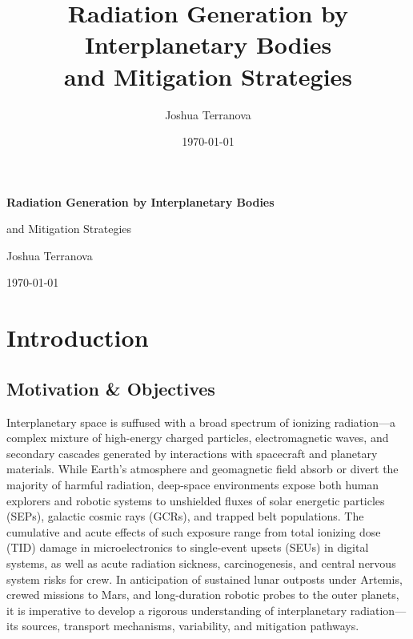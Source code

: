 \documentclass[12pt]{report}
\title{Radiation Generation by Interplanetary Bodies\\
       and Mitigation Strategies}
\author{Joshua Terranova}
\date{\today}
\begin{document}
\begin{titlepage}
  \centering
  {\LARGE\bfseries Radiation Generation by Interplanetary Bodies\\[1ex]}
  {\Large and Mitigation Strategies\par}
  \vspace{2cm}
  {\large Joshua Terranova\par}
  
  \vfill
  {\large \today\par}
\end{titlepage}

\setcounter{page}{1}

\tableofcontents
\newpage

\setcounter{page}{1}

\chapter{Introduction}

\section{Motivation \& Objectives}

Interplanetary space is suffused with a broad spectrum of ionizing radiation—a complex mixture of high-energy charged particles, electromagnetic waves, and secondary cascades generated by interactions with spacecraft and planetary materials.  While Earth’s atmosphere and geomagnetic field absorb or divert the majority of harmful radiation, deep-space environments expose both human explorers and robotic systems to unshielded fluxes of solar energetic particles (SEPs), galactic cosmic rays (GCRs), and trapped belt populations.  The cumulative and acute effects of such exposure range from total ionizing dose (TID) damage in microelectronics to single-event upsets (SEUs) in digital systems, as well as acute radiation sickness, carcinogenesis, and central nervous system risks for crew.  In anticipation of sustained lunar outposts under Artemis, crewed missions to Mars, and long-duration robotic probes to the outer planets, it is imperative to develop a rigorous understanding of interplanetary radiation—its sources, transport mechanisms, variability, and mitigation pathways.
\end{document}
